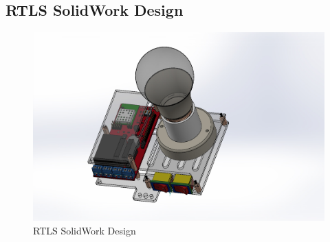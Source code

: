 \documentclass[../../main.tex]{subfiles}
\begin{document}
\graphicspath{{imgs}}

\begin{appendices}
\chapter{RTLS SolidWork Design}
\begin{figure}[H]
    \begin{center}
        \includegraphics[scale=0.5]{Assem.JPG}
    \end{center}
    \caption{RTLS SolidWork Design}
    \label{fig:RTLS_SolidWork_Design}
\end{figure}
\end{appendices}
\end{document}

